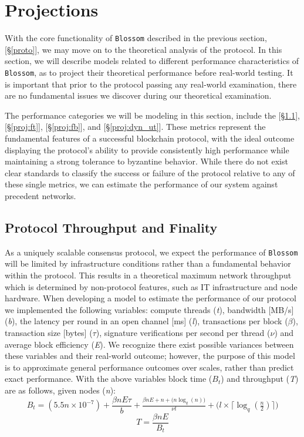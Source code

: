 \section{Projections}\label{proj}
With the core functionality of \texttt{Blossom} described in the previous section, \textit{} [\S\ref{proto}], we may move on to the theoretical analysis of the protocol. In this section, we will describe models related to different performance characteristics of \texttt{Blossom}, as to project their theoretical performance before real-world testing. It is important that prior to the protocol passing any real-world examination, there are no fundamental issues we discover during our theoretical examination.

The performance categories we will be modeling in this section, include the \textit{} [\S\ref{proj:tps}], \textit{} [\S\ref{proj:ft}], \textit{} [\S\ref{proj:fb}], and \textit{} [\S\ref{proj:dyn_ut}]. These metrics represent the fundamental features of a successful blockchain protocol, with the ideal outcome displaying the protocol's ability to provide consistently high performance while maintaining a strong tolerance to byzantine behavior. While there do not exist clear standards to classify the success or failure of the protocol relative to any of these single metrics, we can estimate the performance of our system against precedent networks.

\subsection{Protocol Throughput and Finality}\label{proj:tps}
As a uniquely scalable consensus protocol, we expect the performance of \texttt{Blossom} will be limited by infrastructure conditions rather than a fundamental behavior within the protocol. This results in a theoretical maximum network throughput which is determined by non-protocol features, such as IT infrastructure and node hardware. When developing a model to estimate the performance of our protocol we implemented the following variables: compute threads (\textit{t}), bandwidth [MB/s] (\textit{b}), the latency per round in an open channel [ms] (\textit{l}), transactions per block (\(\beta\)), transaction size [bytes] (\(\tau\)), signature verifications per second per thread (\(\nu\)) and average block efficiency (\textit{E}). We recognize there exist possible variances between these variables and their real-world outcome; however, the purpose of this model is to approximate general performance outcomes over scales, rather than predict exact performance. With the above variables block time (\(B_t\)) and throughput (\textit{T}) are as follows, given nodes (\textit{n}):
\[
B_t =
(5.5n \times 10^{-7})
+
\frac{\beta n E \tau}{b}
+
\tfrac{\beta n E+n+\big(n\log_q(n) \big)}{\nu t}
+
\big (l \times \lceil \log_q(\tfrac{n}{2}) \rceil \big)
\]
\[
T = \frac{\beta n E}{B_t}
\]

